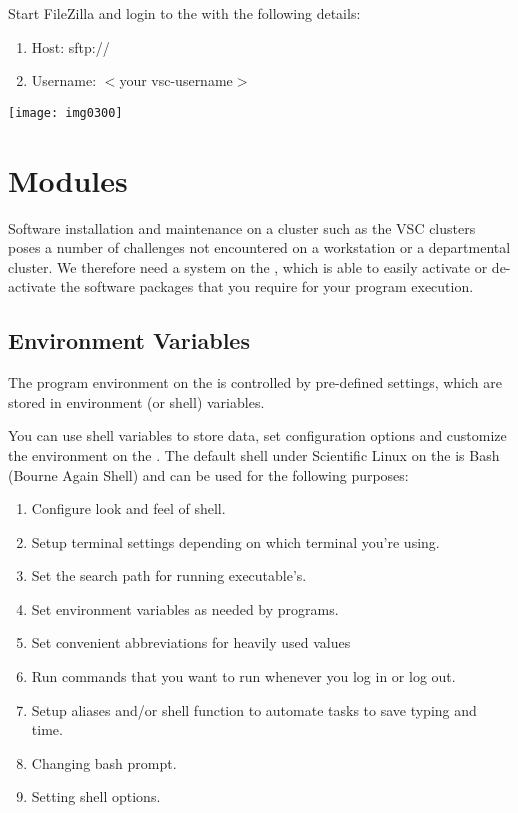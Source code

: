 Start FileZilla and login to the \hpc with the following details:

\begin{enumerate}
\item  Host: sftp://\loginnode
\item  Username:  $<$your vsc-username$>$
\end{enumerate}

\texttt{[image: img0300]}
\fi

\section{Modules}

Software installation and maintenance on a \hpc cluster such as the VSC
clusters poses a number of challenges not encountered on a workstation or a
departmental cluster. We therefore need a system on the \hpc, which is able
to easily activate or de-activate the software packages that you require for
your program execution.

\subsection{Environment Variables}

The program environment on the \hpc is controlled by pre-defined settings,
which are stored in environment (or shell) variables.

You can use shell variables to store data, set configuration options and
customize the environment on the \hpc. The default shell under Scientific
Linux on the \hpc is Bash (Bourne Again Shell) and can be used for the
following purposes:

\begin{enumerate}
\item  Configure look and feel of shell.
\item  Setup terminal settings depending on which terminal you're using.
\item  Set the search path for running executable's.
\item  Set environment variables as needed by programs.
\item  Set convenient abbreviations for heavily used values
\item  Run commands that you want to run whenever you log in or log out.
\item  Setup aliases and/or shell function to automate tasks to save typing and time.
\item  Changing bash prompt.
\item  Setting shell options.
\end{enumerate}

